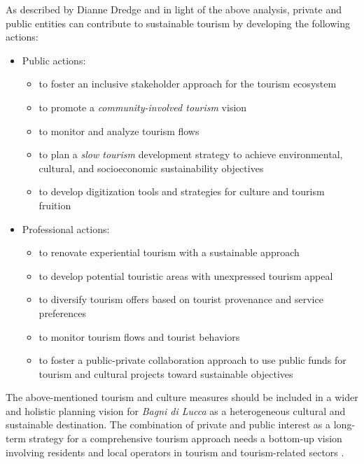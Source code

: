 \documentclass[sustainability,article,submit,pdftex,moreauthors]{Definitions/mdpi}
\begin{document}
As described by \cite{dre22} Dianne Dredge and in light of the above analysis, private and public entities can contribute to sustainable tourism  by developing the following actions: 




\begin{itemize}

\item Public actions: 
\begin{itemize}
\item to foster an inclusive stakeholder approach for the tourism ecosystem 
\item to promote a \textit{community-involved tourism} vision 
\item to monitor and analyze tourism flows 
\item to plan a \emph{slow tourism} development strategy to achieve environmental, cultural, and socioeconomic sustainability objectives 
\item to develop digitization tools and strategies for culture and tourism fruition
\end{itemize}

\item Professional actions: 
\begin{itemize}
\item to renovate experiential tourism with a sustainable approach 
\item to develop potential touristic areas with unexpressed tourism appeal 
\item to diversify tourism offers based on tourist provenance and service preferences 
\item to monitor tourism flows and tourist behaviors 
\item to foster a public-private collaboration approach to use public funds for tourism and cultural projects toward sustainable objectives 
\end{itemize}

\end{itemize}

The above-mentioned tourism and culture measures should be included in a wider and holistic planning vision for \emph{Bagni di Lucca} as a heterogeneous cultural and sustainable destination. The combination of private and public interest as a long-term strategy for a comprehensive tourism approach needs a bottom-up vision involving residents and local operators in tourism and tourism-related sectors \cite{lem20, lem22}.
\end{document}
